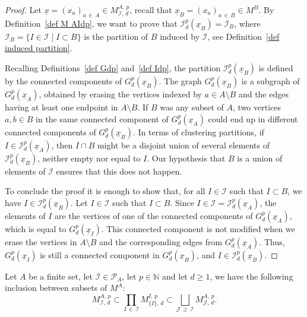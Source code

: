 \documentclass[AHL,Unicode,longabstracts,published]{cedram}
\newcommand{\I}{\mathcal{I}}
\newcommand{\J}{\mathcal{J}}
\newcommand{\pa}{\mathcal{P}\!}
\newcommand{\N}{\mathbb{N}}
\renewcommand{\geq}{\geqslant}
\begin{document}
\begin{proof}
Let $\underline{x} = (x_a)_{a\,\in\,A} \in M^{A,\,p}_{\I,\,d}$, recall that $\underline{x}_B = (x_a)_{a\,\in\,B} \in M^B$. By Definition~\ref{def M AIdp}, we want to prove that $\I^p_d(\underline{x}_B) = \I_B$, where $\I_B = \{I \in \I \mid I \subset B\}$ is the partition of $B$ induced by $\I$, see Definition~\ref{def induced partition}.

Recalling Definitions~\ref{def Gdp} and~\ref{def Idp}, the partition $\I^p_d(\underline{x}_B)$ is defined by the connected components of $G^p_d(\underline{x}_B)$. The graph $G^p_d(\underline{x}_B)$ is a subgraph of $G^p_d(\underline{x}_A)$, obtained by erasing the vertices indexed by $a \in A \setminus B$ and the edges having at least one endpoint in $A \setminus B$. If $B$ was any subset of $A$, two vertices $a,b \in B$ in the same connected component of $G^p_d(\underline{x}_A)$ could end up in different connected components of $G^p_d(\underline{x}_B)$. In terms of clustering partitions, if $I \in \I_d^p(\underline{x}_A)$, then $I \cap B$ might be a disjoint union of several elements of $\I_d^p(\underline{x}_B)$, neither empty nor equal to $I$. Our hypothesis that $B$ is a union of elements of $\I$ ensures that this does not happen.

To conclude the proof it is enough to show that, for all $I \in \I$ such that $I \subset B$, we have $I \in \I_d^p(\underline{x}_B)$. Let $I \in \I$ such that $I \subset B$. Since $I \in \I = \I_d^p(\underline{x}_A)$, the elements of $I$ are the vertices of one of the connected components of $G_d^p(\underline{x}_A)$, which is equal to $G_d^p(\underline{x}_I)$. This connected component is not modified when we erase the vertices in $A \setminus B$ and the corresponding edges from $G_d^p(\underline{x}_A)$. Thus, $G_d^p(\underline{x}_I)$ is still a connected component in $G_d^p(\underline{x}_B)$, and $I \in \I_d^p(\underline{x}_B)$.
\end{proof}

\begin{lemm}\label{lem M AIdp blurred}
Let $A$ be a finite set, let $\I \in \pa_A$, let $p \in \N$ and let $d \geq 1$, we have the following inclusion between subsets of $M^A$:
\[
M^{A,\,p}_{\I,\,d} \subset \prod_{I\,\in\,\I} M^{I,\,p}_{\{I\},\,d} \subset \bigsqcup_{\J\,\geq\,\I} M^{A,\,p}_{\J,\,d}.
\]
\end{lemm}
\end{document}
